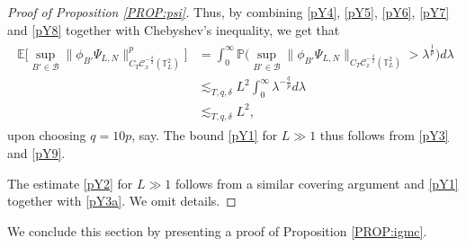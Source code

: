 \documentclass[letterpaper, 11pt,  reqno]{amsart}
\theoremstyle{myremark}
\newcommand{\1}{\hspace{0.5mm}\text{I}\hspace{0.5mm}}
\newcommand{\T}{\mathbb{T}}
\newcommand{\CC}{\mathcal{C}}
\newcommand{\E}{\mathbb{E}}
\newcommand{\dl}{\delta}
\newcommand{\ld}{\lambda}
\newcommand{\les}{\lesssim}
\numberwithin{equation}{section}
\numberwithin{theorem}{section}
\begin{document}
\begin{proof}[Proof of Proposition \ref{PROP:psi}]
Thus, by combining \eqref{pY4}, \eqref{pY5}, \eqref{pY6}, \eqref{pY7} and \eqref{pY8} together with Chebyshev's inequality, we get that
\begin{align}
\begin{split}
\E \Big[\sup_{B' \in \mathcal B} \| \phi_{B'}\Psi_{L, N}\|_{C_T \CC_x^{-\frac \dl 2}(\T_L^2)}^p\Big] & = \int_{0}^{\infty} \mathbb P \Big(\sup_{B' \in \mathcal B} \| \phi_{B'}\Psi_{L, N}\|_{C_T \CC_x^{-\frac \dl 2 }(\T_L^2)} > \ld^{\frac1p}\Big) d \ld \\
& \les_{T,q, \dl} L^2 \int_0^{\infty} \ld^{-\frac q p} d \ld \\
&  \les_{T,q, \dl} L^2,
\label{pY9}
\end{split}
\end{align}
upon choosing $q = 10p$, say. The bound \eqref{pY1} for $L \gg 1$ thus follows from \eqref{pY3} and \eqref{pY9}.

The estimate \eqref{pY2} for $L\gg1$ follows from a similar covering argument and \eqref{pY1} together with \eqref{pY3a}. We omit details.
\end{proof}

We conclude this section by presenting 
a proof of
Proposition \ref{PROP:igmc}.
\end{document}
